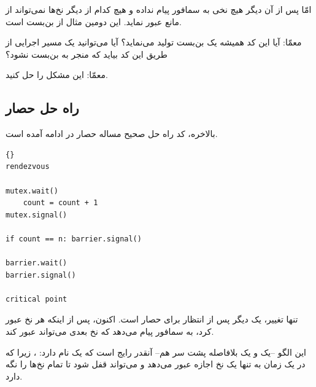 \documentclass{book}
\newcommand{\clearemptydoublepage}{\newpage\cleardoublepage}
\begin{document}
    امّا پس از آن دیگر هیچ نخی به سمافور پیام نداده و هیچ کدام از دیگر نخ‌ها نمی‌تواند از مانع عبور نماید. این دومین مثال از بن‌بست است. 
    
    معمّا: آیا این کد همیشه یک بن‌بست تولید می‌نماید؟ آیا می‌توانید یک مسیر اجرایی از طریق این کد بیاید که منجر به بن‌بست نشود؟ 
    
    معمّا: این مشکل را حل کنید. 


\clearemptydoublepage
\subsection{راه حل حصار}
\label{barrier}

    بالاخره، کد راه حل صحیح مساله حصار در ادامه آمده است. 

\begin{latin}
\begin{latin}
\begin{lstlisting}[title=\rl{راه حل حصار}]{}
rendezvous

mutex.wait()
    count = count + 1
mutex.signal()

if count == n: barrier.signal()

barrier.wait()
barrier.signal()

critical point
\end{lstlisting}
\end{latin}
\end{latin}

    تنها تغییر، یک  دیگر پس از انتظار برای حصار است. 
    اکنون، پس از اینکه هر نخ عبور کرد، به سمافور پیام می‌دهد که نخ بعدی می‌تواند عبور کند. 

    این الگو --یک  و یک  بلافاصله پشت سر هم-- آنقدر رایج است که یک نام دارد: 
    ، 
    زیرا که در یک زمان به تنها یک نخ اجازه عبور می‌دهد و می‌تواند قفل شود تا تمام نخ‌ها را نگه دارد. 
    
\end{document}
